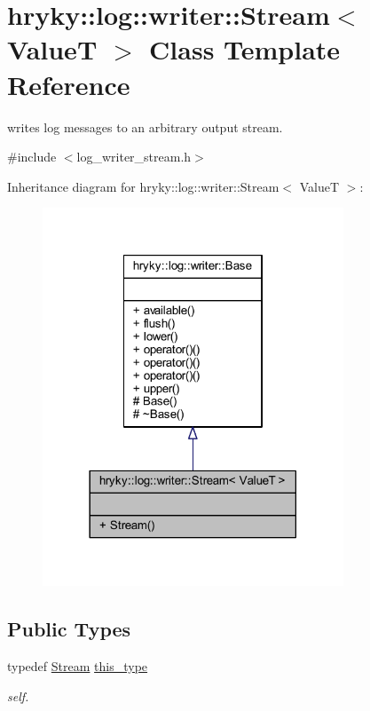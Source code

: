 \hypertarget{classhryky_1_1log_1_1writer_1_1_stream}{\section{hryky\-:\-:log\-:\-:writer\-:\-:Stream$<$ Value\-T $>$ Class Template Reference}
\label{classhryky_1_1log_1_1writer_1_1_stream}
}


writes log messages to an arbitrary output stream.  




{\ttfamily \#include $<$log\-\_\-writer\-\_\-stream.\-h$>$}



Inheritance diagram for hryky\-:\-:log\-:\-:writer\-:\-:Stream$<$ Value\-T $>$\-:
\nopagebreak
\begin{figure}[H]
\begin{center}
\leavevmode
\includegraphics[width=254pt]{classhryky_1_1log_1_1writer_1_1_stream__inherit__graph}
\end{center}
\end{figure}
\subsection*{Public Types}
\begin{DoxyCompactItemize}
\item 
\hypertarget{classhryky_1_1log_1_1writer_1_1_stream_aa2852cc56ab59fe06b1a61cdf384e402}{typedef \hyperlink{classhryky_1_1log_1_1writer_1_1_stream}{Stream} \hyperlink{classhryky_1_1log_1_1writer_1_1_stream_aa2852cc56ab59fe06b1a61cdf384e402}{this\-\_\-type}}\label{classhryky_1_1log_1_1writer_1_1_stream_aa2852cc56ab59fe06b1a61cdf384e402}

\begin{DoxyCompactList}\small\item\em self. \end{DoxyCompactList}\end{DoxyCompactItemize}
